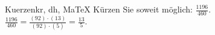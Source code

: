 \begin{MAufgabe}{Kuerzen}{kr, dh, MaTeX}
K\"urzen Sie soweit m\"oglich: $\frac{1196}{460}$.\\ 
\ifLsg\MLoesung
\quad $\frac{1196}{460}=\frac{(92)\cdot(13)}{(92)\cdot(5)}=\frac{13}{5}$.\else\relax\fi
 \end{MAufgabe}